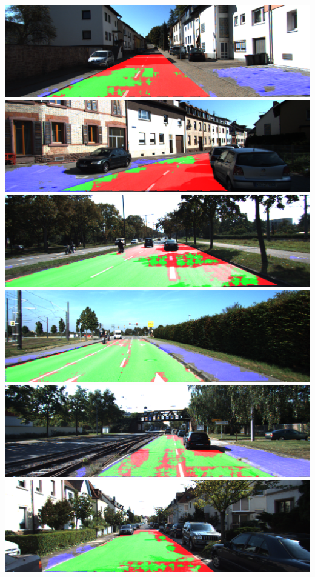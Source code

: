 \includegraphics[scale=0.2]{figures/kitty_eval/Persp_um_road_000077.png}
\includegraphics[scale=0.2]{figures/kitty_eval/Persp_um_road_000095.png}
\includegraphics[scale=0.2]{figures/kitty_eval/Persp_umm_road_000025.png}
\includegraphics[scale=0.2]{figures/kitty_eval/Persp_umm_road_000040.png}
\includegraphics[scale=0.2]{figures/kitty_eval/Persp_umm_road_000066.png}
\includegraphics[scale=0.2]{figures/kitty_eval/Persp_uu_road_000020.png}
